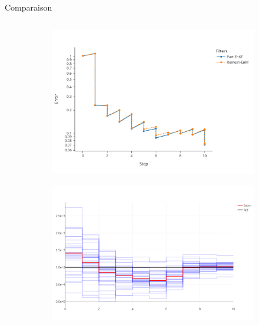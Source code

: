\documentclass[aspectratio=169]{beamer} %
\begin{document}
\begin{frame}{Comparaison}
    \begin{columns}[t]
        \begin{column}{0.33\textwidth}
            \begin{figure}
                \begin{subfigure}{\textwidth}
                    \includegraphics[width=\textwidth]{../../conference/images/dipole_results/error_in_time.pdf}
                \end{subfigure}
                \begin{subfigure}{\textwidth}
                    \includegraphics[width=\textwidth]{../../conference/images/dipole_results/visc_rmf.png}
                \end{subfigure}
            \end{figure}

\end{column}
\end{columns}
\end{frame}
\end{document}
